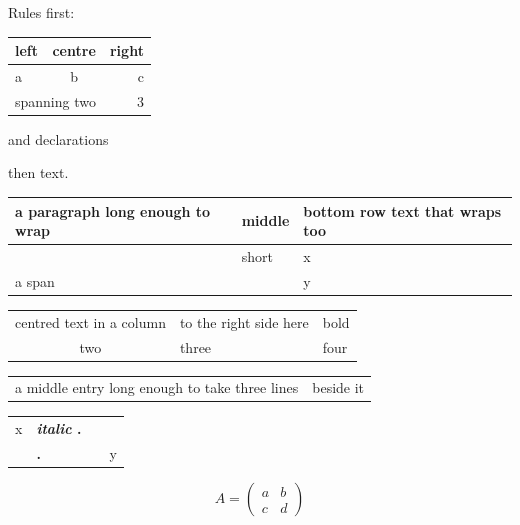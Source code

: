 \documentclass{article}
\begin{document}
Rules first:
\begin{tabular}{|l||c|r|}
\hline
left & centre & right \\
\hline\hline
a & b & c \\
\cline{2-3}
\multicolumn{2}{|c|}{spanning two} & 3 \\
\hline
\end{tabular}
and declarations
then text.

\begin{tabular}{|p{2cm}|m{2cm}|b{2cm}|}
\hline
a paragraph long enough to wrap & middle & bottom row text that wraps too \\[4pt]
\hline
 & short & x \\
\multicolumn{2}{|l|}{a span} & y \\[2pt]
\hline
\end{tabular}

\begin{tabular}{CR{3cm}B}
centred text in a column & to the right side here & bold \\
two & three & four\quad{} \\[2pt]
\end{tabular}

\begin{tabular}{m{2.5cm}l}
a middle entry long enough to take three lines & beside it \\
\end{tabular}

\begin{tabular}{|r>{\bfseries}l<{.}>{\itshape}p{2cm}|l}
x & \textit{italic} & & \\[3pt]
 & & {} & y
\end{tabular}

\[ A = \begin{pmatrix} a & b \\ c & d \end{pmatrix} \]
\end{document}
